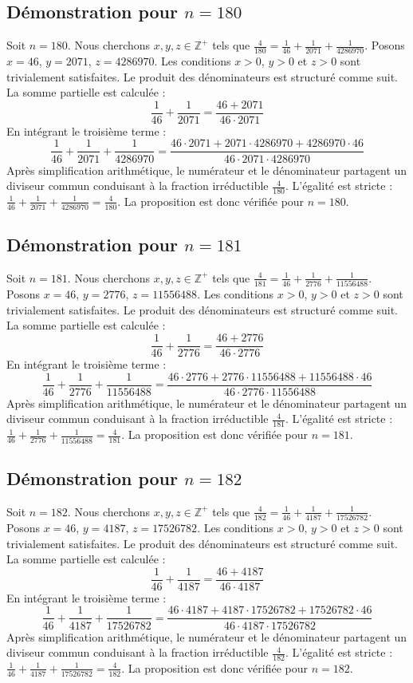 \documentclass[11pt,a4paper]{article}
\begin{document}
\subsection{Démonstration pour $n = 180$}
Soit $n = 180$. Nous cherchons $x, y, z \in \mathbb{Z}^{+}$ tels que $\frac{4}{180} = \frac{1}{46} + \frac{1}{2071} + \frac{1}{4286970}$.
Posons $x = 46$, $y = 2071$, $z = 4286970$.
Les conditions $x > 0$, $y > 0$ et $z > 0$ sont trivialement satisfaites.
Le produit des dénominateurs est structuré comme suit. La somme partielle est calculée :
$$ \frac{1}{46} + \frac{1}{2071} = \frac{46+2071}{46 \cdot 2071} $$
En intégrant le troisième terme :
$$ \frac{1}{46} + \frac{1}{2071} + \frac{1}{4286970} = \frac{46 \cdot 2071 + 2071 \cdot 4286970 + 4286970 \cdot 46}{46 \cdot 2071 \cdot 4286970} $$
Après simplification arithmétique, le numérateur et le dénominateur partagent un diviseur commun conduisant à la fraction irréductible $\frac{4}{180}$.
L'égalité est stricte : $\frac{1}{46} + \frac{1}{2071} + \frac{1}{4286970} = \frac{4}{180}$.
La proposition est donc vérifiée pour $n = 180$.
\subsection{Démonstration pour $n = 181$}
Soit $n = 181$. Nous cherchons $x, y, z \in \mathbb{Z}^{+}$ tels que $\frac{4}{181} = \frac{1}{46} + \frac{1}{2776} + \frac{1}{11556488}$.
Posons $x = 46$, $y = 2776$, $z = 11556488$.
Les conditions $x > 0$, $y > 0$ et $z > 0$ sont trivialement satisfaites.
Le produit des dénominateurs est structuré comme suit. La somme partielle est calculée :
$$ \frac{1}{46} + \frac{1}{2776} = \frac{46+2776}{46 \cdot 2776} $$
En intégrant le troisième terme :
$$ \frac{1}{46} + \frac{1}{2776} + \frac{1}{11556488} = \frac{46 \cdot 2776 + 2776 \cdot 11556488 + 11556488 \cdot 46}{46 \cdot 2776 \cdot 11556488} $$
Après simplification arithmétique, le numérateur et le dénominateur partagent un diviseur commun conduisant à la fraction irréductible $\frac{4}{181}$.
L'égalité est stricte : $\frac{1}{46} + \frac{1}{2776} + \frac{1}{11556488} = \frac{4}{181}$.
La proposition est donc vérifiée pour $n = 181$.
\subsection{Démonstration pour $n = 182$}
Soit $n = 182$. Nous cherchons $x, y, z \in \mathbb{Z}^{+}$ tels que $\frac{4}{182} = \frac{1}{46} + \frac{1}{4187} + \frac{1}{17526782}$.
Posons $x = 46$, $y = 4187$, $z = 17526782$.
Les conditions $x > 0$, $y > 0$ et $z > 0$ sont trivialement satisfaites.
Le produit des dénominateurs est structuré comme suit. La somme partielle est calculée :
$$ \frac{1}{46} + \frac{1}{4187} = \frac{46+4187}{46 \cdot 4187} $$
En intégrant le troisième terme :
$$ \frac{1}{46} + \frac{1}{4187} + \frac{1}{17526782} = \frac{46 \cdot 4187 + 4187 \cdot 17526782 + 17526782 \cdot 46}{46 \cdot 4187 \cdot 17526782} $$
Après simplification arithmétique, le numérateur et le dénominateur partagent un diviseur commun conduisant à la fraction irréductible $\frac{4}{182}$.
L'égalité est stricte : $\frac{1}{46} + \frac{1}{4187} + \frac{1}{17526782} = \frac{4}{182}$.
La proposition est donc vérifiée pour $n = 182$.
\end{document}
